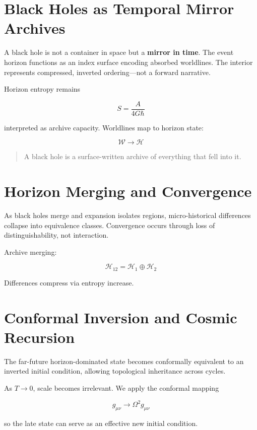 \documentclass[12pt]{article}
\begin{document}
\section{Black Holes as Temporal Mirror Archives}

A black hole is not a container in space but a \textbf{mirror in time}. The event horizon functions as an index surface encoding absorbed worldlines. The interior represents compressed, inverted ordering—not a forward narrative.

Horizon entropy remains

\[
S = \frac{A}{4G\hbar}
\]

interpreted as archive capacity. Worldlines map to horizon state:

\[
\mathcal{W} \rightarrow \mathcal{H}
\]

\begin{quote}
A black hole is a surface-written archive of everything that fell into it.
\end{quote}

\section{Horizon Merging and Convergence}

As black holes merge and expansion isolates regions, micro-historical differences collapse into equivalence classes. Convergence occurs through loss of distinguishability, not interaction.

Archive merging:

\[
\mathcal{H}_{12} = \mathcal{H}_1 \oplus \mathcal{H}_2
\]

Differences compress via entropy increase.

\section{Conformal Inversion and Cosmic Recursion}

The far-future horizon-dominated state becomes conformally equivalent to an inverted initial condition, allowing topological inheritance across cycles.

As $T \to 0$, scale becomes irrelevant. We apply the conformal mapping

\[
g_{\mu\nu} \to \Omega^2 g_{\mu\nu}
\]

so the late state can serve as an effective new initial condition.
\end{document}
